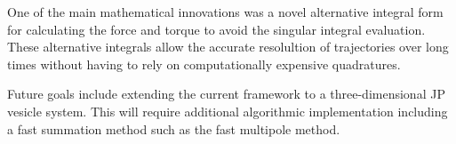 One of the main mathematical innovations was a novel alternative integral
form for calculating the force and torque to avoid the singular integral
evaluation. These alternative integrals allow the accurate resolultion
of trajectories over long times without having to rely on computationally
expensive quadratures.

Future goals include extending the current framework to a
three-dimensional JP vesicle system. This will require additional
algorithmic implementation including a fast summation method such as the
fast multipole method.


%
